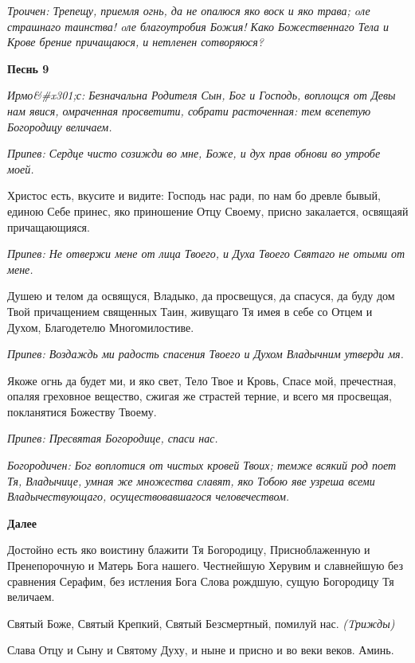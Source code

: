 \itshape Троичен:\normalfont{} Трепещу, приемля огнь, да не опалюся яко воск и яко трава; oле страшнаго таинства! oле благоутробия Божия! Како Божественнаго Тела и Крове брение причащаюся, и нетленен сотворяюся?




\bfseries Песнь 9\normalfont{}


\itshape Ирмо&#x301;с:\normalfont{} Безначальна Родителя Сын, Бог и Господь, воплощся от Девы нам явися, омраченная просветити, собрати расточенная: тем всепетую Богородицу величаем.


\itshape Припев: \normalfont{}Сердце чисто созижди во мне, Боже, и дух прав обнови во утробе моей.


Христос есть, вкусите и видите: Господь нас ради, по нам бо древле бывый, единою Себе принес, яко приношение Отцу Своему, присно закалается, освящаяй причащающияся.


\itshape Припев: \normalfont{}Не отвержи мене от лица Твоего, и Духа Твоего Святаго не отыми от мене.


Душею и телом да освящуся, Владыко, да просвещуся, да спасуся, да буду дом Твой причащением священных Таин, живущаго Тя имея в себе со Отцем и Духом, Благодетелю Многомилостиве.


\itshape Припев: \normalfont{}Воздаждь ми радость спасения Твоего и Духом Владычним утверди мя.


Якоже огнь да будет ми, и яко свет, Тело Твое и Кровь, Спасе мой, пречестная, опаляя греховное вещество, сжигая же страстей терние, и всего мя просвещая, покланятися Божеству Твоему.


\itshape Припев: \normalfont{}Пресвятая Богородице, спаси нас.


\itshape Богородичен: \normalfont{}Бог воплотися от чистых кровей Твоих; темже всякий род поет Тя, Владычице, умная же множества славят, яко Тобою яве узреша всеми Владычествующаго, осуществовавшагося человечеством.




\bfseries Далее\normalfont{}


Достойно есть яко воистину блажити Тя Богородицу, Присноблаженную и Пренепорочную и Матерь Бога нашего. Честнейшую Херувим и славнейшую без сравнения Серафим, без истления Бога Слова рождшую, сущую Богородицу Тя величаем.


Святый Боже, Святый Крепкий, Святый Безсмертный, помилуй нас. \itshape (Tрижды)\normalfont{}


Слава Отцу и Сыну и Святому Духу, и ныне и присно и во веки веков. Аминь.


